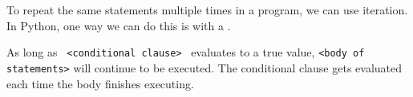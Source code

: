 To repeat the same statements multiple times in a program, we can use
iteration.  In Python, one way we can do this is with a .

As long as \texttt{ <conditional clause> } evaluates to a true value,
\texttt{<body of statements>} will continue to be executed. The conditional
clause gets evaluated each time the body finishes executing.
